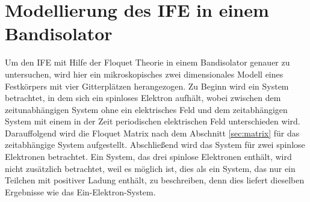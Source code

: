 \chapter{Modellierung des IFE in einem Bandisolator}
\label{sec:model}
Um den IFE mit Hilfe der Floquet Theorie in
einem Bandisolator genauer zu untersuchen, wird hier ein
mikroskopisches zwei dimensionales Modell
eines Festkörpers mit vier Gitterplätzen herangezogen. Zu Beginn
wird ein System betrachtet, in dem sich ein spinloses
Elektron aufhält, wobei zwischen dem
zeitunabhängigen System ohne ein elektrisches Feld
und dem zeitabhängigen System mit einem in der Zeit
periodischen elektrischen Feld unterschieden wird.
Darauffolgend wird die Floquet Matrix nach dem Abschnitt
\ref{sec:matrix} für das
zeitabhängige System aufgestellt. Abschließend wird das
System für zwei spinlose Elektronen betrachtet.
Ein System, das drei spinlose Elektronen enthält,
wird nicht zusätzlich betrachtet, weil
es möglich ist, dies als ein System, das nur ein
Teilchen mit positiver Ladung enthält, zu beschreiben, denn
dies liefert  dieselben
Ergebnisse wie das Ein-Elektron-System.\cite{phillip}



